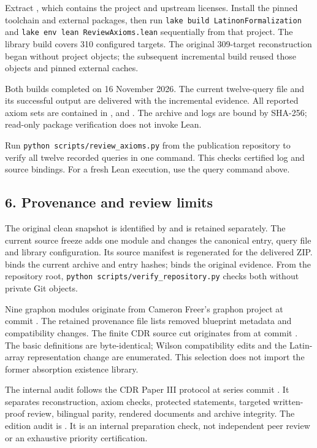 \documentclass[english,11pt,a4paper]{article}
\begin{document}
Extract , which contains the project  and upstream licenses. Install the pinned toolchain and external packages, then run \texttt{lake\ build\ LatinonFormalization} and \texttt{lake\ env\ lean\ ReviewAxioms.lean} sequentially from that project. The library build covers 310 configured targets. The original 309-target reconstruction began without project objects; the subsequent incremental build reused those objects and pinned external caches.

Both builds completed on 16 November 2026. The current twelve-query file and its successful output are delivered with the incremental evidence. All reported axiom sets are contained in ,  and . The archive and logs are bound by SHA-256; read-only package verification does not invoke Lean.

Run \texttt{python\ scripts/review\_axioms.py} from the publication repository to verify all twelve recorded queries in one command. This checks certified log and source bindings. For a fresh Lean execution, use the query command above.

\subsection{6. Provenance and review limits}\label{provenance-and-review-limits}

The original clean snapshot is identified by  and is retained separately. The current source freeze adds one module and changes the canonical entry, query file and library configuration. Its source manifest is regenerated for the delivered ZIP.  binds the current archive and entry hashes;  binds the original evidence. From the repository root, \texttt{python\ scripts/verify\_repository.py} checks both without private Git objects.

Nine graphon modules originate from Cameron Freer's graphon project at commit . The retained provenance file lists removed blueprint metadata and compatibility changes. The finite CDR source cut originates from  at commit . The basic definitions are byte-identical; Wilson compatibility edits and the Latin-array representation change are enumerated. This selection does not import the former absorption existence library.

The internal audit follows the CDR Paper III protocol at series commit . It separates reconstruction, axiom checks, protected statements, targeted written-proof review, bilingual parity, rendered documents and archive integrity. The edition audit is . It is an internal preparation check, not independent peer review or an exhaustive priority certification.
\end{document}

